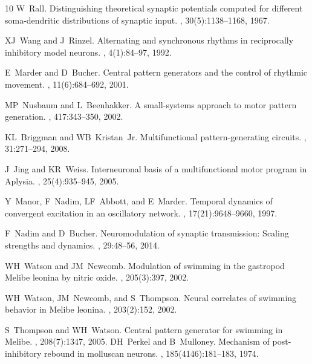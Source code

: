 \documentclass[nofootinbib,aip,amsmath,amssymb,preprint,twocolumn,floatfix,10pt]{revtex4-2}
\begin{document}
\begin{thebibliography}{10}
W~Rall.
\newblock Distinguishing theoretical synaptic potentials computed for different soma-dendritic distributions of synaptic input.
, 30(5):1138--1168, 1967.

XJ~Wang and J~Rinzel.
\newblock Alternating and synchronous rhythms in reciprocally inhibitory model neurons.
, 4(1):84--97, 1992.

E~Marder and D~Bucher.
\newblock Central pattern generators and the control of rhythmic movement.
, 11(6):684--692, 2001.

MP~Nusbaum and L~Beenhakker.
\newblock A small-systems approach to motor pattern generation.
, 417:343--350, 2002.

KL~Briggman and WB~Kristan~Jr.
\newblock Multifunctional pattern-generating circuits.
, 31:271--294, 2008.

J~Jing and KR~Weiss.
\newblock Interneuronal basis of a multifunctional motor program in Aplysia.
, 25(4):935--945, 2005.

Y~Manor, F~Nadim, LF~Abbott, and E~Marder.
\newblock Temporal dynamics of convergent excitation in an oscillatory network.
, 17(21):9648--9660, 1997.

F~Nadim and D~Bucher.
\newblock Neuromodulation of synaptic transmission: Scaling strengths and dynamics.
, 29:48--56, 2014.

WH~Watson and JM~Newcomb.
\newblock Modulation of swimming in the gastropod Melibe leonina by nitric
  oxide.
, 205(3):397, 2002.

WH~Watson, JM~Newcomb, and S~Thompson.
\newblock Neural correlates of swimming behavior in Melibe leonina.
, 203(2):152, 2002.

S~Thompson and WH~Watson.
\newblock Central pattern generator for swimming in Melibe.
, 208(7):1347, 2005.
DH~Perkel and B~Mulloney.
\newblock Mechanism of post-inhibitory rebound in molluscan neurons.
, 185(4146):181--183, 1974.


\end{thebibliography}
\end{document}
